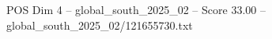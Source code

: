 \begin{textsample}{POS Dim 4 – global\_south\_2025\_02 – Score 33.00 – global\_south\_2025\_02/121655730.txt}
\end{textsample}
